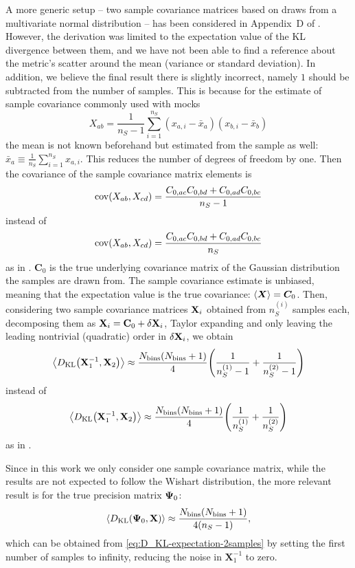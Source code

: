 A more generic setup -- two sample covariance matrices based on draws from a multivariate normal distribution -- has been considered in Appendix~D of \cite{rascalC}.
However, the derivation was limited to the expectation value of the KL divergence between them, and we have not been able to find a reference about the metric's scatter around the mean (variance or standard deviation).
In addition, we believe the final result there is slightly incorrect, namely $1$ should be subtracted from the number of samples.
This is because for the estimate of sample covariance commonly used with mocks
\begin{equation}
X_{ab} = \frac1{n_S-1} \sum_{i=1}^{n_S} (x_{a,i} - \bar x_a) (x_{b,i} - \bar x_b)
\end{equation}
the mean is not known beforehand but estimated from the sample as well: $\bar x_a \equiv \frac1{n_S} \sum_{i=1}^{n_S} x_{a,i}$.
This reduces the number of degrees of freedom by one.
Then the covariance of the sample covariance matrix elements is
\begin{equation} \label{eq:X-covariance}
\operatorname{cov} (X_{ab}, X_{cd}) = \frac{C_{0,ac} C_{0,bd} + C_{0,ad} C_{0,bc}}{n_S-1}
\end{equation}
instead of
$$ \operatorname{cov} (X_{ab}, X_{cd}) = \frac{C_{0,ac} C_{0,bd} + C_{0,ad} C_{0,bc}}{n_S} $$
as in \cite{rascalC}.
${\bm C}_0$ is the true underlying covariance matrix of the Gaussian distribution the samples are drawn from.
The sample covariance estimate is unbiased, meaning that the expectation value is the true covariance: ${\left\langle \bm X \right\rangle}={\bm C}_0$.
Then, considering two sample covariance matrices ${\bf X}_i$ obtained from $n_S^{(i)}$ samples each, decomposing them as ${\bf X}_i={\bf C}_0+{\bf \delta X}_i$, Taylor expanding and only leaving the leading nontrivial (quadratic) order in ${\bf \delta X}_i$, we obtain
\begin{equation} \label{eq:D_KL-expectation-2samples}
{\left\langle D_{\rm KL} {\left( {\bf X}_1^{-1}, {\bf X}_2 \right)} \right\rangle} \approx \frac{N_{\rm bins}(N_{\rm bins}+1)}4 {\left( \frac1{n_S^{(1)}-1} + \frac1{n_S^{(2)}-1} \right)}
\end{equation}
instead of
$$ {\left\langle D_{\rm KL} {\left( {\bf X}_1^{-1}, {\bf X}_2 \right)} \right\rangle} \approx \frac{N_{\rm bins}(N_{\rm bins}+1)}4 {\left( \frac1{n_S^{(1)}} + \frac1{n_S^{(2)}} \right)} $$
as in \cite{rascalC}.

Since in this work we only consider one sample covariance matrix, while the \rascalc{} results are not expected to follow the Wishart distribution, the more relevant result is for the true precision matrix ${\bf \Psi}_0$:
\begin{equation} \label{eq:D_KL-expectation}
{\left\langle D_{\rm KL} {\left( {\bf \Psi}_0, {\bf X} \right)} \right\rangle} \approx \frac{N_{\rm bins}(N_{\rm bins}+1)}{4(n_S-1)},
\end{equation}
which can be obtained from \cref{eq:D_KL-expectation-2samples} by setting the first number of samples to infinity, reducing the noise in ${\bm X}_1^{-1}$ to zero.

